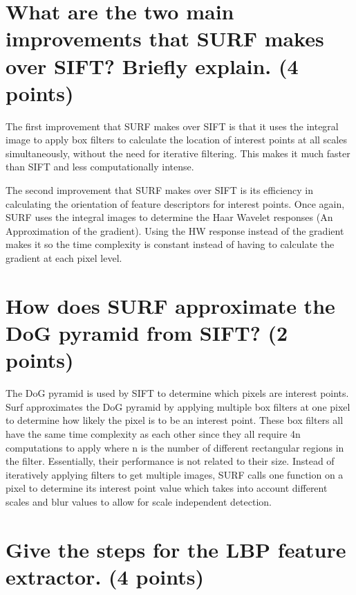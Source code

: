 \documentclass{assignment-x}
\begin{document}
\maketitle
\pagebreak

\section{What are the two main improvements that SURF makes over SIFT? Briefly explain. (4 points)}
The first improvement that SURF makes over SIFT is that it uses the integral image to apply box filters to calculate the location of interest points at all scales simultaneously, without the need for iterative filtering. This makes it much faster than SIFT and less computationally intense.

The second improvement that SURF makes over SIFT is its efficiency in calculating the orientation of feature descriptors for interest points. Once again, SURF uses the integral images to determine the Haar Wavelet responses (An Approximation of the gradient). Using the HW response instead of the gradient makes it so the time complexity is constant instead of having to calculate the gradient at each pixel level.

\section{How does SURF approximate the DoG pyramid from SIFT? (2 points)}
The DoG pyramid is used by SIFT to determine which pixels are interest points. Surf approximates the DoG pyramid by applying multiple box filters at one pixel to determine how likely the pixel is to be an interest point. These box filters all have the same time complexity as each other since they all require 4n computations to apply where n is the number of different rectangular regions in the filter. Essentially, their performance is not related to their size. Instead of iteratively applying filters to get multiple images, SURF calls one function on a pixel to determine its interest point value which takes into account different scales and blur values to allow for scale independent detection.

\section{Give the steps for the LBP feature extractor. (4 points)}
\end{document}
